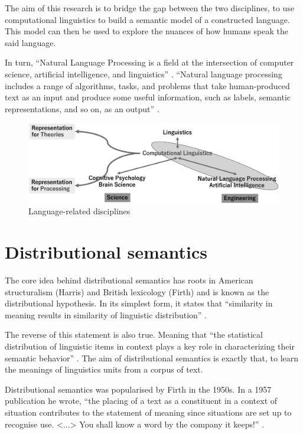 \documentclass[14pt, a4paper]{extreport}
\begin{document}
The aim of this research is to bridge the gap between the two disciplines, to use computational linguistics to build a semantic model of a constructed language. This model can then be used to explore the nuances of how humans speak the said language.

In turn, ``Natural Language Processing is a field at the intersection of computer science, artificial intelligence, and linguistics'' \parencite[7]{practicalnlp}. ``Natural language processing includes a range of algorithms, tasks, and problems that take human-produced text as an input and produce some useful information, such as labels, semantic representations, and so on, as an output'' \parencite[4]{realworldnlp}.

\begin{figure}[ht]
\bigskip
\includegraphics[width=14cm]{nlpcl}
\centering
\caption{Language-related disciplines \parencite{nlpandcl}}
\end{figure}

\section{Distributional semantics}

The core idea behind distributional semantics has roots in American structuralism (Harris) and British lexicology (Firth) and is known as the distributional hypothesis. In its simplest form, it states that ``similarity in meaning results in similarity of linguistic distribution'' \parencite{harris}.

The reverse of this statement is also true. Meaning that ``the statistical distribution of linguistic items in context plays a key role in characterizing their semantic behavior'' \parencite{lenci}. The aim of distributional semantics is exactly that, to learn the meanings of linguistics units from a corpus of text.

Distributional semantics was popularised by Firth in the 1950s. In a 1957 publication he wrote, ``the placing of a text as a constituent in a context of situation contributes to the statement of meaning since situations are set up to recognise use. <...> You shall know a word by the company it keeps!'' \parencite[11]{firth}.
\end{document}

